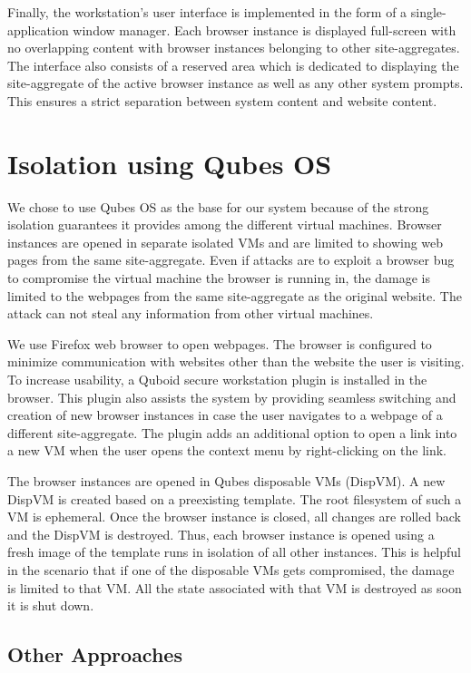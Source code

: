 Finally, the workstation's user interface is implemented in the form of a single-application window manager. Each browser instance is displayed full-screen with no overlapping content with browser instances belonging to other site-aggregates. The interface also consists of a reserved area which is dedicated to displaying the site-aggregate of the active browser instance as well as any other system prompts. This ensures a strict separation between system content and website content.

\section{Isolation using Qubes OS}

We chose to use Qubes OS as the base for our system because of the strong isolation guarantees it provides among the different virtual machines. Browser instances are opened in separate isolated VMs and are limited to showing web pages from the same site-aggregate. Even if attacks are to exploit a browser bug to compromise the virtual machine the browser is running in, the damage is limited to the webpages from the same site-aggregate as the original website. The attack can not steal any information from other virtual machines. 

We use Firefox web browser to open webpages. The browser is configured to minimize communication with websites other than the website the user is visiting. To increase usability, a Quboid secure workstation plugin is installed in the browser. This plugin also assists the system by providing seamless switching and creation of new browser instances in case the user navigates to a webpage of a different site-aggregate. The plugin adds an additional option to open a link into a new VM when the user opens the context menu by right-clicking on the link.

The browser instances are opened in Qubes disposable VMs (DispVM). A new DispVM is created based on a preexisting template. The root filesystem of such a VM is ephemeral. Once the browser instance is closed, all changes are rolled back and the DispVM is destroyed. Thus, each browser instance is opened using a fresh image of the template runs in isolation of all other instances. This is helpful in the scenario that if one of the disposable VMs gets compromised, the damage is limited to that VM. All the state associated with that VM is destroyed as soon it is shut down.

\subsection{Other Approaches}

